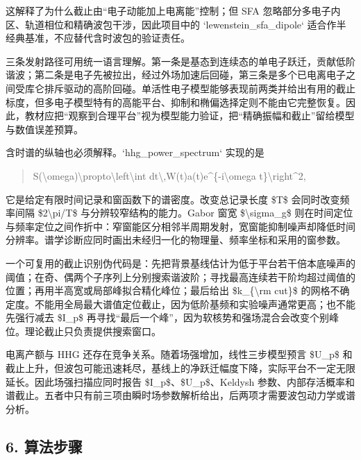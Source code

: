 \documentclass[UTF8,openany,11pt,fontset=fandol]{ctexbook}
\begin{document}
这解释了为什么截止由``电子动能加上电离能''控制；但 SFA
忽略部分多电子内区、轨道相位和精确波包干涉，因此项目中的
`lewenstein\_sfa\_dipole` 适合作半经典基准，不应替代含时波包的验证责任。

三条发射路径可用统一语言理解。第一条是基态到连续态的单电子跃迁，贡献低阶谐波；第二条是电子先被拉出，经过外场加速后回碰，第三条是多个已电离电子之间受库仑排斥驱动的高阶回碰。单活性电子模型能够表现前两类并给出有用的截止标度，但多电子模型特有的高能平台、抑制和椭偏选择定则不能由它完整恢复。因此，教材应把``观察到合理平台''视为模型能力验证，把``精确振幅和截止''留给模型与数值误差预算。

含时谱的纵轴也必须解释。`hhg\_power\_spectrum` 实现的是

\begin{quote}
S(\textbackslash omega)\textbackslash propto\textbackslash left\textbar\textbackslash int
dt\textbackslash,W(t)a(t)e\^{}\{-i\textbackslash omega
t\}\textbackslash right\textbar\^{}2,
\end{quote}

它是给定有限时间记录和窗函数下的谱密度。改变总记录长度 \$T\$
会同时改变频率间隔 \$2\textbackslash pi/T\$ 与分辨较窄结构的能力。Gabor
窗宽 \$\textbackslash sigma\_g\$
则在时间定位与频率定位之间作折中：窄窗能区分相邻半周期发射，宽窗能抑制噪声却降低时间分辨率。谱学诊断应同时画出未经归一化的物理量、频率坐标和采用的窗参数。

一个可复用的截止识别伪代码是：先把背景基线估计为低于平台若干倍本底噪声的阈值；在奇、偶两个子序列上分别搜索谐波阶；寻找最高连续若干阶均超过阈值的位置；再用半高宽或局部峰拟合精化峰位；最后给出
\$k\_\{\textbackslash rm cut\}\$
的网格不确定度。不能用全局最大谱值定位截止，因为低阶基频和实验噪声通常更高；也不能先强行减去
\$I\_p\$
再寻找``最后一个峰''，因为软核势和强场混合会改变个别峰位。理论截止只负责提供搜索窗口。

电离产额与 HHG 还存在竞争关系。随着场强增加，线性三步模型预言 \$U\_p\$
和截止上升，但波包可能迅速耗尽，基线上的净跃迁幅度下降，实际平台不一定无限延长。因此场强扫描应同时报告
\$I\_p\$、\$U\_p\$、Keldysh
参数、内部存活概率和谱截止。五者中只有前三项由瞬时场参数解析给出，后两项才需要波包动力学或谱分析。

\subsection{\texorpdfstring{\textbf{6.
算法步骤}}{6. 算法步骤}}\label{ux7b97ux6cd5ux6b65ux9aa4-1}
\end{document}
